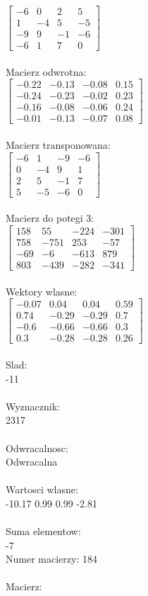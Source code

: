 \documentclass[a4paper,12pt]{article}
\begin{document}
$\begin{bmatrix} -6&0&2&5\\1&-4&5&-5\\-9&9&-1&-6\\-6&1&7&0 \end{bmatrix}$
\\
\\
Macierz odwrotna:\\

$\begin{bmatrix} -0.22&-0.13&-0.08&0.15\\-0.24&-0.23&-0.02&0.23\\-0.16&-0.08&-0.06&0.24\\-0.01&-0.13&-0.07&0.08 \end{bmatrix}$
\\
\\
Macierz transponowana:\\

$\begin{bmatrix} -6&1&-9&-6\\0&-4&9&1\\2&5&-1&7\\5&-5&-6&0 \end{bmatrix}$
\\
\\
Macierz do potegi 3:\\

$\begin{bmatrix} 158&55&-224&-301\\758&-751&253&-57\\-69&-6&-613&879\\803&-439&-282&-341 \end{bmatrix}$
\\
\\
Wektory wlasne:\\

$\begin{bmatrix} -0.07&0.04&0.04&0.59\\0.74&-0.29&-0.29&0.7\\-0.6&-0.66&-0.66&0.3\\0.3&-0.28&-0.28&0.26 \end{bmatrix}$
\\
\\
Slad:\\
-11
\\
\\
Wyznacznik:\\
2317
\\
\\
Odwracalnosc:\\
Odwracalna
\\
\\
Wartosci wlasne:\\
-10.17 0.99 0.99 -2.81
\\
\\
Suma elementow:\\
-7
\\
\newpage
Numer macierzy:
184
\\
\\
Macierz:\\
\end{document}
